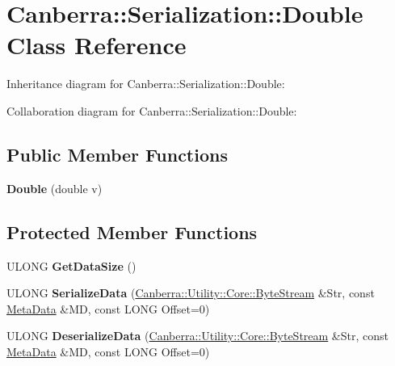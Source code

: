 \hypertarget{class_canberra_1_1_serialization_1_1_double}{}\section{Canberra\+:\+:Serialization\+:\+:Double Class Reference}
\label{class_canberra_1_1_serialization_1_1_double}


Inheritance diagram for Canberra\+:\+:Serialization\+:\+:Double\+:


Collaboration diagram for Canberra\+:\+:Serialization\+:\+:Double\+:
\subsection*{Public Member Functions}
\begin{DoxyCompactItemize}
\item 
\mbox{\label{class_canberra_1_1_serialization_1_1_double_a94091f217ddd115ce107ac7324e3df50}} 
{\bfseries Double} (double v)
\end{DoxyCompactItemize}
\subsection*{Protected Member Functions}
\begin{DoxyCompactItemize}
\item 
\mbox{\label{class_canberra_1_1_serialization_1_1_double_a4502b90ec139193c6d16799966aa3693}} 
U\+L\+O\+NG {\bfseries Get\+Data\+Size} ()
\item 
\mbox{\label{class_canberra_1_1_serialization_1_1_double_aeb0ffacab876a148de91f3b3891cb623}} 
U\+L\+O\+NG {\bfseries Serialize\+Data} (\hyperlink{class_canberra_1_1_utility_1_1_core_1_1_byte_stream}{Canberra\+::\+Utility\+::\+Core\+::\+Byte\+Stream} \&Str, const \hyperlink{class_canberra_1_1_serialization_1_1_meta_data}{Meta\+Data} \&MD, const L\+O\+NG Offset=0)
\item 
\mbox{\label{class_canberra_1_1_serialization_1_1_double_a2412d5cb3e184549ad692a108db3a25e}} 
U\+L\+O\+NG {\bfseries Deserialize\+Data} (\hyperlink{class_canberra_1_1_utility_1_1_core_1_1_byte_stream}{Canberra\+::\+Utility\+::\+Core\+::\+Byte\+Stream} \&Str, const \hyperlink{class_canberra_1_1_serialization_1_1_meta_data}{Meta\+Data} \&MD, const L\+O\+NG Offset=0)
\end{DoxyCompactItemize}
